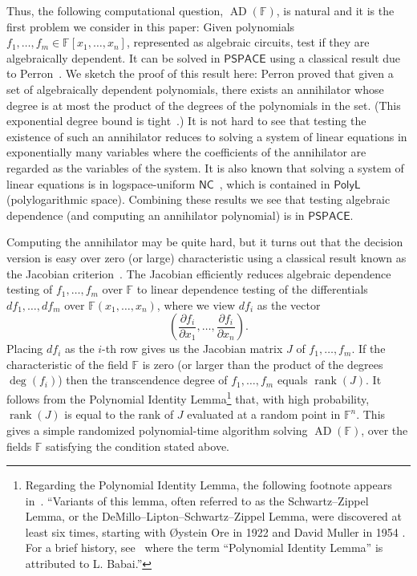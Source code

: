 \documentclass[11pt]{article}
\numberwithin{equation}{section}
\theoremstyle{definition}
\theoremstyle{plain}
\newcommand{\cclass}[1]{\textsf{#1}}
\newcommand{\F}{\mathbb{F}}
\DeclareMathOperator{\rk}{\mathrm{rank}}
\newcommand{\PSPACE}{\cclass{PSPACE}\xspace}  %
\newcommand{\NC}{\cclass{NC}\xspace}  %
\newcommand{\PolyL}{\cclass{PolyL}\xspace}  %
\DeclareMathOperator{\AD}{\mathrm{AD}\xspace} %
\begin{document}
%
%

Thus, the following computational question, %
%
%
$\AD(\F)$,   %
is natural and it is the first problem we consider in this paper: 
Given polynomials
%
%
$f_1,\ldots ,f_m \in \F[x_1, \ldots ,x_n]$,  %
represented as algebraic circuits, %
test if they are algebraically dependent. 
It can be solved in $\PSPACE$ using a classical result due to
Perron~\cite{Per27,Plo05}. 
We sketch the proof of this result here:
Perron proved that given a set of algebraically dependent polynomials, there exists an annihilator whose degree is
%
at most  %
the product of the degrees of the polynomials in the
%
set. (This exponential degree bound is tight~\cite{Kay09}.) %
It is not hard to see that testing the existence of such an annihilator reduces to solving a
%
system of linear equations in exponentially many variables %
where the coefficients of the annihilator are regarded as the
variables of the system.
It is also  known that solving a
%
%
%
system of linear equations %
is in logspace-uniform 
%
%
$\NC$~\cite{C76, BGH82, Mul87}, %
which is contained in $\PolyL$ (polylogarithmic space). %
%
%
Combining these results  %
we see that testing algebraic dependence
(and computing an annihilator polynomial) is in $\PSPACE$.
 
Computing the annihilator may be quite hard, but it turns out that the decision version is easy over zero (or large) characteristic using a classical result known as the Jacobian criterion~\cite{Jac41, BMS13}. The Jacobian efficiently reduces algebraic dependence testing of $f_1,\ldots,f_m$ over $\F$ to linear dependence testing of the differentials $df_1,\ldots,df_m$ over $\F(x_1,\ldots,x_n)$, where we view $df_i$ as the vector
\[
  \left( \frac{\partial f_i} {\partial x_1},\ldots, \frac{\partial f_i} {\partial x_n}\right).
\]
Placing $df_i$ as the $i$-th row gives us the Jacobian matrix $J$ of
$f_1,\ldots,f_m$. If the characteristic of the field $\F$ is zero (or
larger than the product of the degrees $\deg(f_i)$) then the
transcendence degree of $f_1,\dots,f_m$ equals $\rk(J)$.  It follows
from the
%
Polynomial Identity Lemma\footnote{Regarding the Polynomial Identity
Lemma, the following footnote appears in~\cite{CKS}. ``Variants of this
lemma, often referred to as the Schwartz--Zippel Lemma, or the
DeMillo--Lipton--Schwartz--Zippel Lemma,
were discovered at least six times, starting with
{\O}ystein Ore in 1922 and David Muller in 1954
\cite{ore,muller,schmidt,demillo1978probabilistic,zippel1979probabilistic,Sch80}.
For a brief history, see~\cite{arvind}
where the term ``Polynomial Identity Lemma''
is attributed to L. Babai.''}
that, with high probability, $\rk(J)$ is equal to the rank of $J$ evaluated at a random point in $\F^n$. This gives a simple randomized
%
polynomial-time   %
algorithm solving
%
$\AD(\F)$,   %
%
over the fields $\F$ satisfying the condition stated above.   %
\end{document}
